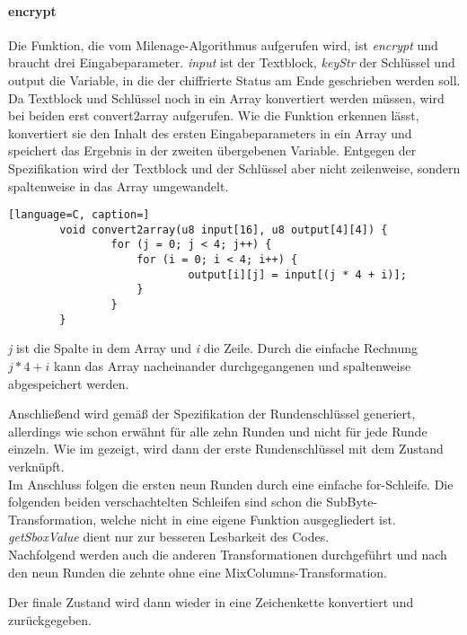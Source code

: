 		\paragraph{encrypt}
		Die Funktion, die vom Milenage-Algorithmus aufgerufen wird, ist \emph{encrypt} und
		braucht drei Eingabeparameter. \emph{input} ist der Textblock, \emph{keyStr} der
		Schlüssel und output die Variable, in die der chiffrierte Status am Ende geschrieben
		werden soll. \\
		Da Textblock und Schlüssel noch in ein Array konvertiert werden müssen,
		wird bei beiden erst convert2array aufgerufen. Wie die Funktion erkennen lässt,
		konvertiert sie den Inhalt des ersten Eingabeparameters in ein Array und speichert das
		Ergebnis in der zweiten übergebenen Variable. Entgegen der Spezifikation wird der
		Textblock und der Schlüssel aber nicht zeilenweise, sondern spaltenweise in das
		Array umgewandelt.

		\begin{lstlisting}[language=C, caption=]
		void convert2array(u8 input[16], u8 output[4][4]) {
    			for (j = 0; j < 4; j++) {
        			for (i = 0; i < 4; i++) {
            				output[i][j] = input[(j * 4 + i)];
        			}
    			}
		} 
        		\end{lstlisting}

		\emph{j} ist die Spalte in dem Array und \emph{i} die Zeile. Durch die einfache
		Rechnung $j*4+i$ kann das Array nacheinander durchgegangenen und spaltenweise
		abgespeichert werden.

		Anschließend wird gemäß der Spezifikation der Rundenschlüssel generiert, allerdings
		wie schon erwähnt für alle zehn Runden und nicht für jede Runde einzeln. Wie im
		 gezeigt, wird dann der erste Rundenschlüssel mit dem
		Zustand verknüpft. \\
		Im Anschluss folgen die ersten neun Runden durch eine einfache for-Schleife. Die
		folgenden beiden verschachtelten Schleifen sind schon die SubByte-Transformation,
		welche nicht in eine eigene Funktion ausgegliedert ist. \emph{getSboxValue} dient
		nur zur besseren Lesbarkeit des Codes. \\
		Nachfolgend werden auch die anderen Transformationen durchgeführt und nach den neun
		Runden die zehnte ohne eine MixColumns-Transformation.

		Der finale Zustand wird dann wieder in eine Zeichenkette konvertiert und
		zurückgegeben.

